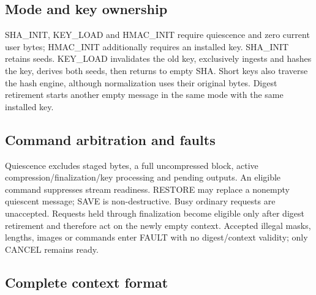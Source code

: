 \documentclass[11pt,a4paper]{article}
\begin{document}
\subsection{Mode and key ownership}

SHA\_\allowbreak{}INIT,\allowbreak{} KEY\_\allowbreak{}LOAD and HMAC\_\allowbreak{}INIT require quiescence and zero current user bytes; HMAC\_\allowbreak{}INIT additionally requires an installed key. SHA\_\allowbreak{}INIT retains seeds. KEY\_\allowbreak{}LOAD invalidates the old key,\allowbreak{} exclusively ingests and hashes the key,\allowbreak{} derives both seeds,\allowbreak{} then returns to empty SHA. Short keys also traverse the hash engine,\allowbreak{} although normalization uses their original bytes. Digest retirement starts another empty message in the same mode with the same installed key.

\subsection{Command arbitration and faults}

Quiescence excludes staged bytes,\allowbreak{} a full uncompressed block,\allowbreak{} active compression/\allowbreak{}finalization/\allowbreak{}key processing and pending outputs. An eligible command suppresses stream readiness. RESTORE may replace a nonempty quiescent message; SAVE is non-destructive. Busy ordinary requests are unaccepted. Requests held through finalization become eligible only after digest retirement and therefore act on the newly empty context. Accepted illegal masks,\allowbreak{} lengths,\allowbreak{} images or commands enter FAULT with no digest/\allowbreak{}context validity; only CANCEL remains ready.

\subsection{Complete context format}
\end{document}

